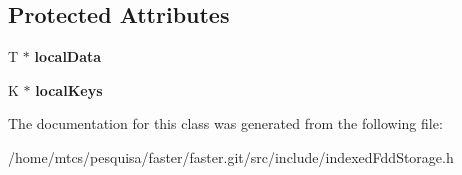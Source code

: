 \subsection*{Protected Attributes}
\begin{DoxyCompactItemize}
\item 
\hypertarget{classfaster_1_1indexedFddStorageCore_afc155f998bfe42973147af89bf75cfa5}{}T $\ast$ {\bfseries local\+Data}\label{classfaster_1_1indexedFddStorageCore_afc155f998bfe42973147af89bf75cfa5}

\item 
\hypertarget{classfaster_1_1indexedFddStorageCore_a4a31c9b81ef61a2aca489bdc010566f9}{}K $\ast$ {\bfseries local\+Keys}\label{classfaster_1_1indexedFddStorageCore_a4a31c9b81ef61a2aca489bdc010566f9}

\end{DoxyCompactItemize}


The documentation for this class was generated from the following file\+:\begin{DoxyCompactItemize}
\item 
/home/mtcs/pesquisa/faster/faster.\+git/src/include/indexed\+Fdd\+Storage.\+h\end{DoxyCompactItemize}
